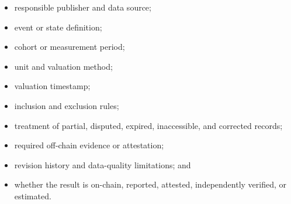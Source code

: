 \documentclass[11pt]{article}
\begin{document}
\begin{itemize}[leftmargin=*]
\item responsible publisher and data source;
\item event or state definition;
\item cohort or measurement period;
\item unit and valuation method;
\item valuation timestamp;
\item inclusion and exclusion rules;
\item treatment of partial, disputed, expired, inaccessible, and corrected records;
\item required off-chain evidence or attestation;
\item revision history and data-quality limitations; and
\item whether the result is on-chain, reported, attested, independently verified, or estimated.
\end{itemize}
\end{document}
